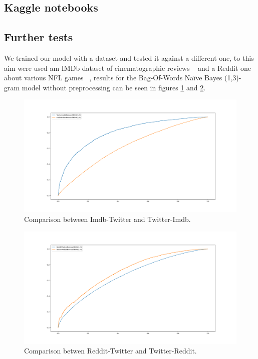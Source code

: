 \subsection*{Kaggle notebooks}

\subsection*{Further tests}
We trained our model with a dataset and tested it against a different one, to this aim were used am IMDb dataset of cinematographic reviews ~\cite{data:imdb} and a Reddit one about various NFL games ~\cite{data:reddit}, results for the Bag-Of-Words Na\"ive Bayes (1,3)-gram model without preprocessing can be seen in figures \ref{fig:TwitterImdb} and \ref{fig:TwitterReddit}.

\begin{figure}[h!t]
    \centering
    \includegraphics[scale=0.25]{../experiments/plots/ImdbTwitter}
    \caption{Comparison between Imdb-Twitter and Twitter-Imdb.}
    \label{fig:TwitterImdb}        
\end{figure}

\begin{figure}[h!t]
    \centering
    \includegraphics[scale=0.25]{../experiments/plots/RedditTwitter}
    \caption{Comparison betwen Reddit-Twitter and Twitter-Reddit.}
    \label{fig:TwitterReddit}
\end{figure}

